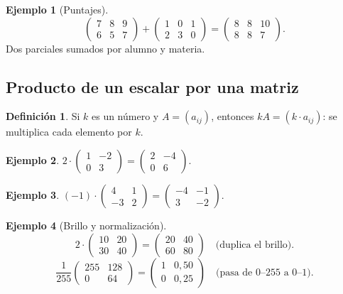 \documentclass[a4paper,12pt]{article}
\theoremstyle{definition}
\newtheorem{definicion}{Definición}[section]
\newtheorem{ejemplo}{Ejemplo}[section]
\begin{document}
\begin{ejemplo}[Puntajes]
\[
\begin{pmatrix} 7 & 8 & 9 \\ 6 & 5 & 7 \end{pmatrix} + \begin{pmatrix} 1 & 0 & 1 \\ 2 & 3 & 0 \end{pmatrix} = \begin{pmatrix} 8 & 8 & 10 \\ 8 & 8 & 7 \end{pmatrix}.
\]
Dos parciales sumados por alumno y materia.
\end{ejemplo}

\subsection{Producto de un escalar por una matriz}
\begin{definicion}
Si $k$ es un número y $A=(a_{ij})$, entonces $kA=(k \cdot a_{ij})$: se multiplica cada elemento por $k$.
\end{definicion}

\begin{ejemplo}
$2 \cdot \begin{pmatrix} 1 & -2 \\ 0 & 3 \end{pmatrix} = \begin{pmatrix} 2 & -4 \\ 0 & 6 \end{pmatrix}$.
\end{ejemplo}

\begin{ejemplo}
$(-1) \cdot \begin{pmatrix} 4 & 1 \\ -3 & 2 \end{pmatrix} = \begin{pmatrix} -4 & -1 \\ 3 & -2 \end{pmatrix}$.
\end{ejemplo}

\begin{ejemplo}[Brillo y normalización]
\[
2 \cdot \begin{pmatrix} 10 & 20 \\ 30 & 40 \end{pmatrix} = \begin{pmatrix} 20 & 40 \\ 60 & 80 \end{pmatrix} \quad \text{(duplica el brillo).}
\]
\[
\frac{1}{255}\begin{pmatrix} 255 & 128 \\ 0 & 64 \end{pmatrix} = \begin{pmatrix} 1 & 0{,}50 \\ 0 & 0{,}25 \end{pmatrix} \quad \text{(pasa de 0--255 a 0--1).}
\]
\end{ejemplo}
\end{document}
